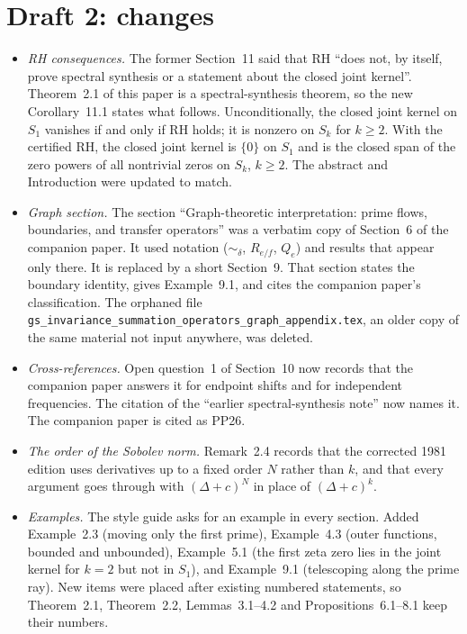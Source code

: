 \documentclass[12pt,letterpaper]{article}
\begin{document}
\section{Draft 2: changes}
\begin{itemize}
\item \emph{RH consequences.}  The former Section~11 said that RH ``does
  not, by itself, prove spectral synthesis or a statement about the closed
  joint kernel''.  Theorem~2.1 of this paper is a spectral-synthesis
  theorem, so the new Corollary~11.1 states what follows.  Unconditionally,
  the closed joint kernel on $S_1$ vanishes if and only if RH holds; it is
  nonzero on $S_k$ for $k\ge2$.  With the certified RH, the closed joint
  kernel is $\{0\}$ on $S_1$ and is the closed span of the zero powers of
  all nontrivial zeros on $S_k$, $k\ge2$.  The abstract and Introduction
  were updated to match.
\item \emph{Graph section.}  The section ``Graph-theoretic interpretation:
  prime flows, boundaries, and transfer operators'' was a verbatim copy of
  Section~6 of the companion paper.  It used notation ($\sim_\delta$,
  $R_{e/f}$, $Q_e$) and results that appear only there.  It is replaced by
  a short Section~9.  That section states the boundary identity, gives
  Example~9.1, and cites the companion paper's classification.  The
  orphaned file \nolinkurl{gs_invariance_summation_operators_graph_appendix.tex},
  an older copy of the same material not input anywhere, was deleted.
\item \emph{Cross-references.}  Open question~1 of Section~10 now records
  that the companion paper answers it for endpoint shifts and for
  independent frequencies.  The citation of the ``earlier spectral-synthesis
  note'' now names it.  The companion paper is cited as PP26.
\item \emph{The order of the Sobolev norm.}  Remark~2.4 records that the
  corrected 1981 edition uses derivatives up to a fixed order $N$ rather
  than $k$, and that every argument goes through with $(\Delta+c)^N$ in
  place of $(\Delta+c)^k$.
\item \emph{Examples.}  The style guide asks for an example in every
  section.  Added Example~2.3 (moving only the first prime), Example~4.3
  (outer functions, bounded and unbounded), Example~5.1 (the first zeta
  zero lies in the joint kernel for $k=2$ but not in $S_1$), and
  Example~9.1 (telescoping along the prime ray).  New items were placed
  after existing numbered statements, so Theorem~2.1, Theorem~2.2,
  Lemmas~3.1--4.2 and Propositions~6.1--8.1 keep their numbers.

\end{itemize}
\end{document}
